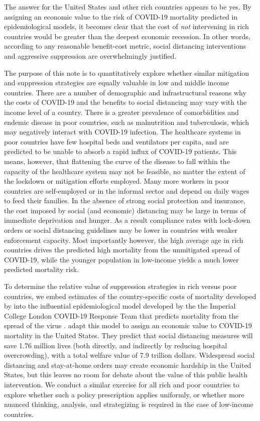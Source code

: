 \documentclass[11pt]{article}
\begin{document}
The answer for the United States and other rich countries appears to be yes. By assigning an economic value to the risk of COVID-19 mortality predicted in epidemiological models, it becomes clear that the cost of \textit{not} intervening in rich countries would be greater than the deepest economic recession. In other words, according to any reasonable benefit-cost metric, social distancing interventions and aggressive suppression are overwhelmingly justified.

The purpose of this note is to quantitatively explore whether similar mitigation and suppression strategies are equally valuable in low and middle income countries. There are a number of demographic and infrastructural reasons why the costs of COVID-19 and the benefits to social distancing may vary with the income level of a country. There is a greater prevalence of comorbidities and endemic disease in poor countries, such as malnutrition and tuberculosis, which may negatively interact with COVID-19 infection. The healthcare systems in poor countries have few hospital beds and ventilators per capita, and are predicted to be unable to absorb a rapid influx of COVID-19 patients. This means, however, that flattening the curve of the disease to fall within the capacity of the healthcare system may not be feasible, no matter the extent of the lockdown or mitigation efforts employed. Many more workers in poor countries are self-employed or in the informal sector and depend on daily wages to feed their families. In the absence of strong social protection and insurance, the cost imposed by social (and economic) distancing may be large in terms of immediate deprivation and hunger. As a result compliance rates with lock-down orders or social distancing guidelines may be lower in countries with weaker enforcement capacity. Most importantly however, the high average age in rich countries drives the predicted high mortality from the unmitigated spread of COVID-19, while the younger population in low-income yields a much lower predicted mortality risk.

To determine the relative value of suppression strategies in rich versus poor countries, we embed estimates of the country-specific costs of mortality developed by \textcite{viscusi2017} into the influential epidemiological model developed by the the Imperial College London COVID-19 Response Team that predicts mortality from the spread of the virus \parencite{squire,ferguson2020,walker2020}. \textcite{greenstone2020} adapt this model to assign an economic value to COVID-19 mortality in the United States. They predict that social distancing measures will save 1.76 million lives (both directly, and indirectly by reducing hospital overcrowding), with a total welfare value of 7.9 trillion dollars. Widespread social distancing and stay-at-home orders may create economic hardship in the United States, but this leaves no room for debate about the value of this public health intervention. We conduct a similar exercise for all rich and poor countries to explore whether such a policy prescription applies uniformly, or whether more nuanced thinking, analysis, and strategizing is required in the case of low-income countries.
\end{document}
